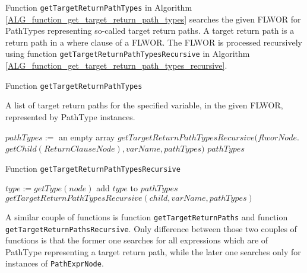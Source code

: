 Function \texttt{getTargetReturnPathTypes} in Algorithm \ref{ALG_function_get_target_return_path_types} searches the given FLWOR for PathTypes representing so-called target return paths. A target return path is a return path in a where clause of a FLWOR. The FLWOR is processed recursively using function \texttt{getTargetReturnPathTypesRecursive} in Algorithm \ref{ALG_function_get_target_return_path_types_recursive}.

\begin{algorithm}
\caption{Function \texttt{getTargetReturnPathTypes}}
\label{ALG_function_get_target_return_path_types}
\begin{algorithmic}[1]
\ENSURE A list of target return paths for the specified variable, in the given FLWOR, represented by PathType instances.

\STATE $pathTypes :=$ an empty array
\STATE $getTargetReturnPathTypesRecursive(flworNode.$ $getChild(ReturnClauseNode), varName, pathTypes)$
\RETURN $pathTypes$
\end{algorithmic}
\end{algorithm}

\begin{algorithm}
\caption{Function \texttt{getTargetReturnPathTypesRecursive}}
\label{ALG_function_get_target_return_path_types_recursive}
\begin{algorithmic}[1]

	\STATE $type := getType(node)$
		\STATE add $type$ to $pathTypes$
	\ENDIF
\ENDIF
{}
	\STATE $getTargetReturnPathTypesRecursive(child, varName, pathTypes)$
\ENDFOR
\end{algorithmic}
\end{algorithm}

A similar couple of functions is function \texttt{getTargetReturnPaths} and function \texttt{getTargetReturnPathsRecursive}. Only difference between those two couples of functions is that the former one searches for all expressions which are of PathType representing a target return path, while the later one searches only for instances of \texttt{PathExprNode}.

